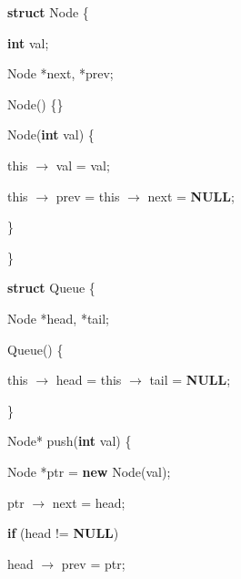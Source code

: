 \begin{algorithm}
	\begin{algorithmic}

		\State \textbf{struct} Node \{

		\State \hspace{1cm} \textbf{int} val;

		\State \hspace{1cm} Node *next, *prev;

		\State \hspace{1cm} Node() \{\}

		\State \hspace{1cm} Node(\textbf{int} val) \{

		\State \hspace{2cm} this $\rightarrow$ val = val;

		\State \hspace{2cm} this $\rightarrow$ prev = this $\rightarrow$ next = \textbf{NULL};

		\State \hspace{1cm} \}

		\State \}

		\vspace{0.5cm}

		\State \textbf{struct} Queue \{

		\State \hspace{1cm} Node *head, *tail;

		\State \hspace{1cm} Queue() \{

		\State \hspace{2cm} this $\rightarrow$ head = this $\rightarrow$ tail = \textbf{NULL};

		\State \hspace{1cm} \}

		\vspace{0.5cm}

		\State \hspace{1cm} Node* push(\textbf{int} val) \{

		\State \hspace{2cm} Node *ptr = \textbf{new} Node(val);

		\State \hspace{2cm} ptr $\rightarrow$ next = head;

		\State \hspace{2cm} \textbf{if} (head != \textbf{NULL})

		\State \hspace{3cm} head $\rightarrow$ prev = ptr;


\end{algorithmic}
\end{algorithm}
